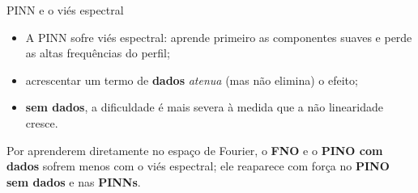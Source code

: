 \begin{frame}{PINN e o viés espectral}
  \begin{itemize}
    \item A PINN \alert{sofre viés espectral}: aprende primeiro as componentes suaves e
          perde as altas frequências do perfil;
    \item acrescentar um termo de \textbf{dados} \emph{atenua} (mas não elimina) o efeito;
    \item \textbf{sem dados}, a dificuldade é mais severa à medida que a não linearidade cresce.
  \end{itemize}

  \begin{information}
    Por aprenderem diretamente no espaço de Fourier, o \textbf{FNO} e o \textbf{PINO com
    dados} sofrem menos com o viés espectral; ele reaparece com força no \textbf{PINO sem
    dados} e nas \textbf{PINNs}.
  \end{information}
\end{frame}
